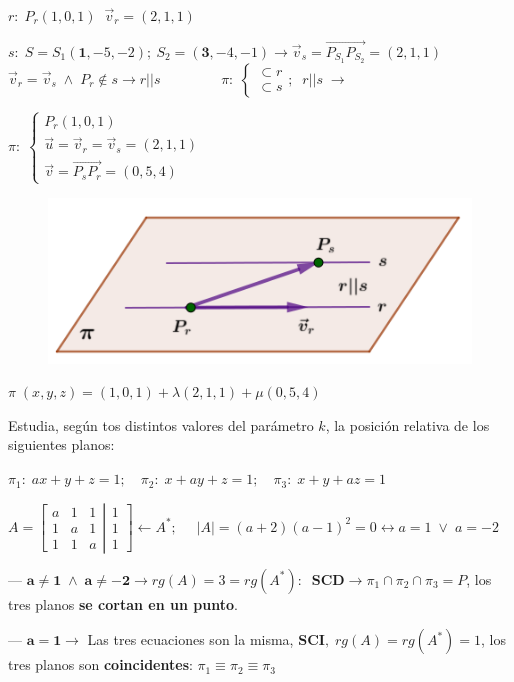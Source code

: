 \begin{proofw}\renewcommand{\qedsymbol}{$\diamond$}
	$r:\; P_r(1,0,1)\;\; \vec v_r=(2,1,1)$
	
\noindent $s:\; S=S_1(\boldsymbol{1},-5,-2); \ S_2=(\boldsymbol{3},-4,-1) \to \vec v_s=\overrightarrow{P_{S_1}P_{S_2}}=(2,1,1)$
\noindent \textcolor{gris}{$\vec v_r = \vec v_s \; \wedge\; P_r \notin s \to r||s $} $\qquad \qquad \pi:\; \begin{cases} \subset r \\ \subset s \end{cases};\;\; r||s \;\to$
\begin{multicols}{2}
\noindent $\pi:\; \begin{cases} P_r(1,0,1)\\ \vec u=\vec v_r=\vec v_s=(2,1,1) \\ \vec v=\overrightarrow{P_sP_r} =(0,5,4)	\end{cases}$
	\begin{figure}[H]
		\centering
		\includegraphics[width=.45\textwidth]{imagenes/imagenes10/T10IM25.png}
 	\end{figure}
 \end{multicols}
 
\noindent $\pi\; (x,y,z)=(1,0,1)+\lambda(2,1,1)+\mu(0,5,4)$
\end{proofw}




\begin{ejre}
	Estudia, según tos distintos valores del parámetro $k$, la posición relativa de los siguientes planos:
	
$\pi_1:\; ax+y+z=1; \quad \pi_2:\; x+ay+z=1;\quad \pi_3:\; x+y+az=1$
\end{ejre}

\begin{proofw}\renewcommand{\qedsymbol}{$\diamond$}
	
\small{$A=\left[ \begin{matrix} a&1&1\\1&a&1\\1&1&a \end{matrix} \right. \left| \begin{matrix} 1\\1\\1 \end{matrix} \right] \leftarrow A^*;$
$\quad|A|=(a+2)(a-1)^2 = 0 \leftrightarrow a=1 \; \vee \; a=-2$}

--- \normalsize{$\boldsymbol{a\neq 1 \;\wedge \; a\neq -2} \to rg(A)=3=rg(A^*):\;\;\boldsymbol{SCD}\to \pi_1 \cap  \pi_2 \cap  \pi_3 =P$}, los tres planos \textbf{se cortan en un punto}. 

--- $\boldsymbol{a=1} \to $ Las tres ecuaciones son la misma, $\boldsymbol{SCI},\; rg(A)=rg(A^*)=1$, los tres planos son \textbf{coincidentes}: $\pi_1 \equiv \pi_2 \equiv \pi_3$
\end{proofw}



